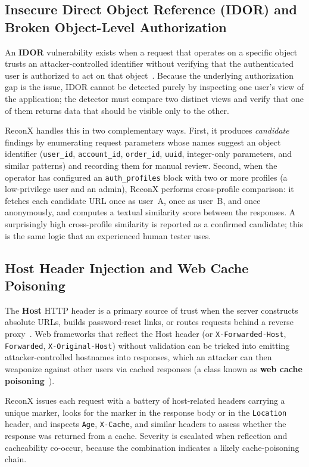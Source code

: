\subsection{Insecure Direct Object Reference (IDOR) and Broken Object-Level Authorization}

An \textbf{IDOR} vulnerability exists when a request that operates on a specific object trusts an attacker-controlled identifier without verifying that the authenticated user is authorized to act on that object~\cite{owasp_bola}. Because the underlying authorization gap is the issue, IDOR cannot be detected purely by inspecting one user's view of the application; the detector must compare two distinct views and verify that one of them returns data that should be visible only to the other.

ReconX handles this in two complementary ways. First, it produces \textit{candidate} findings by enumerating request parameters whose names suggest an object identifier (\texttt{user\_id}, \texttt{account\_id}, \texttt{order\_id}, \texttt{uuid}, integer-only parameters, and similar patterns) and recording them for manual review. Second, when the operator has configured an \texttt{auth\_profiles} block with two or more profiles (a low-privilege user and an admin), ReconX performs cross-profile comparison: it fetches each candidate URL once as user~A, once as user~B, and once anonymously, and computes a textual similarity score between the responses. A surprisingly high cross-profile similarity is reported as a confirmed candidate; this is the same logic that an experienced human tester uses.

\subsection{Host Header Injection and Web Cache Poisoning}

The \textbf{Host} HTTP header is a primary source of trust when the server constructs absolute URLs, builds password-reset links, or routes requests behind a reverse proxy~\cite{portswigger_host}. Web frameworks that reflect the Host header (or \texttt{X-Forwarded-Host}, \texttt{Forwarded}, \texttt{X-Original-Host}) without validation can be tricked into emitting attacker-controlled hostnames into responses, which an attacker can then weaponize against other users via cached responses (a class known as \textbf{web cache poisoning}~\cite{portswigger_cache}).

ReconX issues each request with a battery of host-related headers carrying a unique marker, looks for the marker in the response body or in the \texttt{Location} header, and inspects \texttt{Age}, \texttt{X-Cache}, and similar headers to assess whether the response was returned from a cache. Severity is escalated when reflection and cacheability co-occur, because the combination indicates a likely cache-poisoning chain.


